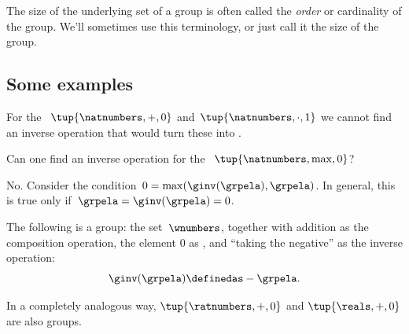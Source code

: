 
\begin{remark}
    The size of the underlying set of a group is often called the \emph{order} or cardinality of the group.
    We'll sometimes use this terminology, or just call it the size of the group.
\end{remark}

\subsection{Some examples}



\begin{example}
    For the ~$\tup{\natnumbers, +, 0}$ and~$\tup{\natnumbers, \cdot, 1}$ we cannot find an inverse operation that would turn these  into .
\end{example}

\begin{exercise}
    Can one find an inverse operation for the ~$\tup{\natnumbers,\max,0}$?
\end{exercise}
%
\begin{solution}
    No.
    Consider the condition~$0=\max(\ginv(\grpela),\grpela)$.
    In general, this is true only if~$\grpela=\ginv(\grpela)=0$.
\end{solution}

\begin{example}
    The following is a group: the set~$\wnumbers$, together with addition as the composition operation, the element $0$ as , and ``taking the negative'' as the inverse operation:
    \begin{equation}
        \ginv(\grpela) \definedas -\grpela.
    \end{equation}
    

In a completely analogous way, $\tup{\ratnumbers, +, 0}$ and $\tup{\reals, + , 0}$ are also groups.    
\end{example}


